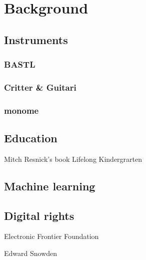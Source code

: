 \chapter{Background}

\section{Instruments}

\subsection{BASTL}

\subsection{Critter \& Guitari}

\subsection{monome}



\section{Education}

Mitch Resnick's book Lifelong Kindergrarten

\section{Machine learning}

\section{Digital rights}

Electronic Frontier Foundation

Edward Snowden
